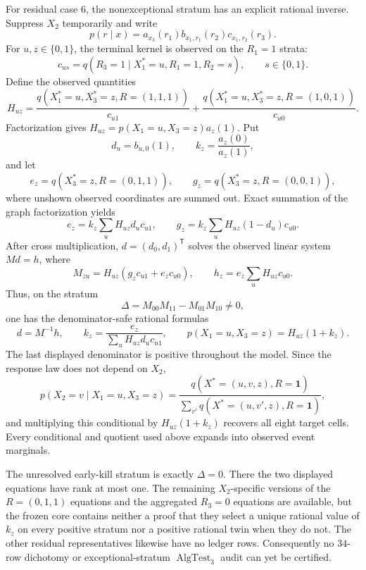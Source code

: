 For residual case \(6\), the nonexceptional stratum has an explicit rational inverse.  Suppress \(X_2\) temporarily and write
\[
p(r\mid x)=a_{x_3}(r_1)b_{x_1,r_1}(r_2)c_{x_1,r_2}(r_3).
\]
For \(u,z\in\{0,1\}\), the terminal kernel is observed on the \(R_1=1\) strata:
\[
c_{us}=q(R_3=1\mid X_1^*=u,R_1=1,R_2=s),\qquad s\in\{0,1\}.
\]
Define the observed quantities
\[
H_{uz}=
\frac{q(X_1^*=u,X_3^*=z,R=(1,1,1))}{c_{u1}}
+
\frac{q(X_1^*=u,X_3^*=z,R=(1,0,1))}{c_{u0}}.
\]
Factorization gives \(H_{uz}=p(X_1=u,X_3=z)a_z(1)\).  Put
\[
d_u=b_{u,0}(1),\qquad k_z=\frac{a_z(0)}{a_z(1)},
\]
and let
\[
e_z=q(X_3^*=z,R=(0,1,1)),\qquad
g_z=q(X_3^*=z,R=(0,0,1)),
\]
where unshown observed coordinates are summed out.  Exact summation of the graph factorization yields
\[
e_z=k_z\sum_uH_{uz}d_uc_{u1},\qquad
g_z=k_z\sum_uH_{uz}(1-d_u)c_{u0}.
\]
After cross multiplication, \(d=(d_0,d_1)^{\mathsf T}\) solves the observed linear system \(Md=h\), where
\[
M_{zu}=H_{uz}(g_zc_{u1}+e_zc_{u0}),
\qquad
h_z=e_z\sum_uH_{uz}c_{u0}.
\]
Thus, on the stratum
\[
\Delta=M_{00}M_{11}-M_{01}M_{10}\ne0,
\]
one has the denominator-safe rational formulas
\[
d=M^{-1}h,\qquad
k_z=\frac{e_z}{\sum_uH_{uz}d_uc_{u1}},\qquad
p(X_1=u,X_3=z)=H_{uz}(1+k_z).
\]
The last displayed denominator is positive throughout the model.  Since the response law does not depend on \(X_2\),
\[
p(X_2=v\mid X_1=u,X_3=z)
=
\frac{q(X^*=(u,v,z),R=\mathbf1)}
{\sum_{v'}q(X^*=(u,v',z),R=\mathbf1)},
\]
and multiplying this conditional by \(H_{uz}(1+k_z)\) recovers all eight target cells.  Every conditional and quotient used above expands into observed event marginals.

The unresolved early-kill stratum is exactly \(\Delta=0\).  There the two displayed equations have rank at most one.  The remaining \(X_2\)-specific versions of the \(R=(0,1,1)\) equations and the aggregated \(R_3=0\) equations are available, but the frozen core contains neither a proof that they select a unique rational value of \(k_z\) on every positive stratum nor a positive rational twin when they do not.  The other residual representatives likewise have no ledger rows.  Consequently no \(34\)-row dichotomy or exceptional-stratum \(\operatorname{AlgTest}_3\) audit can yet be certified.